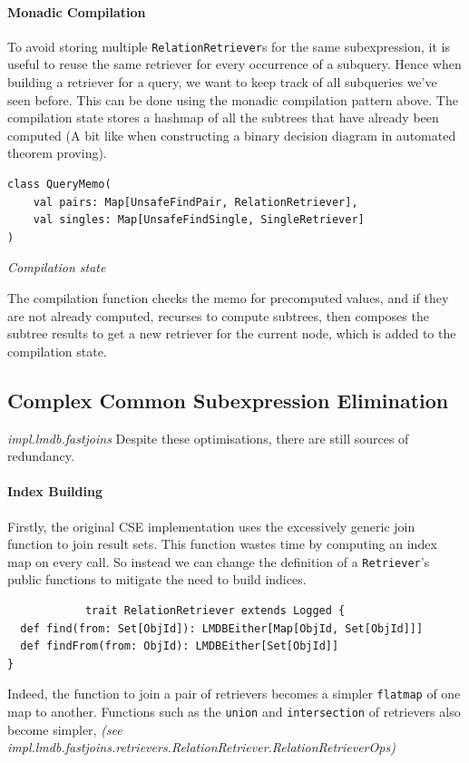 \documentclass[12pt,a4paper,twoside,openright]{report}
\newcommand\codeName[1]{\texttt{#1}}
\newcommand\note[1]{\textit{#1}}
\renewcommand{\baselinestretch}{1.1}    %
\begin{document}
		
		\paragraph{Monadic Compilation}
		To avoid storing multiple \codeName{RelationRetriever}s for the same subexpression, it is useful to reuse the same retriever for every occurrence of a subquery. Hence when building a retriever for a query, we want to keep track of all subqueries we've seen before. This can be done using the monadic compilation pattern above. The compilation state stores a hashmap of all the subtrees that have already been computed (A bit like when constructing a binary decision diagram in automated theorem proving). 
		
\renewcommand{\baselinestretch}{0.8}
\begin{framed}
\begin{verbatim}
class QueryMemo(
    val pairs: Map[UnsafeFindPair, RelationRetriever], 
    val singles: Map[UnsafeFindSingle, SingleRetriever]
)
\end{verbatim}
\note{Compilation state}
\end{framed}
\renewcommand{\baselinestretch}{1.1}

		The compilation function checks the memo for precomputed values, and if they are not already computed, recurses to compute subtrees, then composes the subtree results to get a new retriever for the current node, which is added to the compilation state.
		
	\subsection{Complex Common Subexpression Elimination}
	\note{impl.lmdb.fastjoins}
Despite these optimisations, there are still sources of redundancy.

		\paragraph{Index Building}
			Firstly, the original CSE implementation uses the excessively generic join function to join result sets. This function wastes time by computing an index map on every call. So instead we can change the definition of a \codeName{Retriever}'s public functions to mitigate the need to build indices.
			\renewcommand{\baselinestretch}{0.8}
			\begin{framed}
			\begin{verbatim}
			trait RelationRetriever extends Logged {
  def find(from: Set[ObjId]): LMDBEither[Map[ObjId, Set[ObjId]]]
  def findFrom(from: ObjId): LMDBEither[Set[ObjId]]
}
			\end{verbatim}
			\end{framed}
			\renewcommand{\baselinestretch}{1.1}
			Indeed, the function to join a pair of retrievers becomes a simpler \codeName{flatmap} of one map to another. Functions such as the \codeName{union} and \codeName{intersection} of retrievers also become simpler, \note{(see impl.lmdb.fastjoins.retrievers.RelationRetriever.RelationRetrieverOps)}
\end{document}
